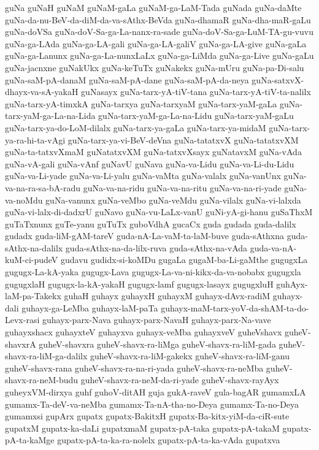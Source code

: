{guNa
guNaH
guNaM
guNaM-gaLa
guNaM-ga-LaM-Tada
guNada
guNa-daMte
guNa-da-nu-BeV-da-diM-da-va-sAthx-BeVda
guNa-dhamaR
guNa-dha-maR-gaLu
guNa-doVSa
guNa-doV-Sa-ga-La-nanx-ra-sade
guNa-doV-Sa-ga-LuM-TA-gu-vuvu
guNa-ga-LAda
guNa-ga-LA-gali
guNa-ga-LA-galiV
guNa-ga-LA-give
guNa-gaLa
guNa-ga-Lanunx
guNa-ga-La-nunxLaLx
guNa-ga-LiMda
guNa-ga-Live
guNa-gaLu
guNa-jacnxne
guNakUkx
guNa-keTuTx
guNakekx
guNa-mUru
guNa-pa-Di-salu
guNa-saM-pA-danaM
guNa-saM-pA-dane
guNa-saM-pA-da-neya
guNa-satxvX-dhayx-va-sA-yakaH
guNasayx
guNa-tarx-yA-tiV-tana
guNa-tarx-yA-tiV-ta-nalilx
guNa-tarx-yA-timxkA
guNa-tarxya
guNa-tarxyaM
guNa-tarx-yaM-gaLa
guNa-tarx-yaM-ga-La-na-Lida
guNa-tarx-yaM-ga-La-na-Lidu
guNa-tarx-yaM-gaLu
guNa-tarx-ya-do-LoM-dilalx
guNa-tarx-ya-gaLa
guNa-tarx-ya-midaM
guNa-tarx-ya-ra-hi-ta-vAgi
guNa-tarx-ya-vi-BeV-deVna
guNa-tatatxvX
guNa-tatatxvXM
guNa-ta-tatxvXmaM
guNatatxvXM
guNa-tatxvXsayx
guNatavxM
guNa-vAda
guNa-vA-gali
guNa-vAnf
guNavU
guNava
guNa-va-Lidu
guNa-va-Li-du-Lidu
guNa-va-Li-yade
guNa-va-Li-yalu
guNa-vaMta
guNa-valalx
guNa-vanUnx
guNa-va-na-ra-sa-bA-radu
guNa-va-na-ridu
guNa-va-na-ritu
guNa-va-na-ri-yade
guNa-va-noMdu
guNa-vanunx
guNa-veMbo
guNa-veMdu
guNa-vilalx
guNa-vi-lalxda
guNa-vi-lalx-di-dadxrU
guNavo
guNa-vu-LaLx-vanU
guNi-yA-gi-hanu
guSaThxM
guTaTxnunx
guTe-yanu
guTuTx
guboVdhA
gucaCx
guda
gudada
guda-dalilx
gudadx
guda-liM-gAM-tareV
guda-nA-La-vaM-ta-laM-buve
guda-sAthxna
guda-sAthx-na-dalilx
guda-sAthx-na-da-lilx-ruva
guda-sAthx-na-vAda
guda-va-nA-kuM-ci-pudeV
gudavu
gudidx-si-koMDu
gugaLa
gugaM-ba-Li-gaMthe
gugugxLa
gugugx-La-kA-yaka
gugugx-Lava
gugugx-La-va-ni-kikx-da-va-nobabx
gugugxla
gugugxlaH
gugugx-la-kA-yakaH
gugugx-lamf
gugugx-lasayx
gugugxluH
guhAyx-laM-pa-Takekx
guhaH
guhayx
guhayxH
guhayxM
guhayx-dAvx-radiM
guhayx-dali
guhayx-ga-LeMba
guhayx-laM-paTa
guhayx-maM-tarx-yoV-da-shAM-ta-do-Levx-rasi
guhayx-parx-Nava
guhayx-parx-NavaH
guhayx-parx-Na-vave
guhayxshacx
guhayxteV
guhayxva
guhayx-veMba
guhayxveV
guheVshavx
guheV-shavxrA
guheV-shavxra
guheV-shavx-ra-liMga
guheV-shavx-ra-liM-gada
guheV-shavx-ra-liM-ga-dalilx
guheV-shavx-ra-liM-gakekx
guheV-shavx-ra-liM-ganu
guheV-shavx-rana
guheV-shavx-ra-na-ri-yada
guheV-shavx-ra-neMba
guheV-shavx-ra-neM-budu
guheV-shavx-ra-neM-da-ri-yade
guheV-shavx-rayAyx
guheyxVM-dirxya
guhf
guhoV-ditAH
guja
gukA-raveV
gula-bagAR
gumamxLA
gumamx-Ta-deV-va-neMba
gumamx-Ta-nA-tha-no-Deya
gumamx-Ta-no-Deya
gumamxsi
gupArx
gupatx
gupatx-BakitxH
gupatx-Ba-kitx-yiM-da-ciR-sute
gupatxM
gupatx-ka-daLi
gupatxmaM
gupatx-pA-taka
gupatx-pA-takaM
gupatx-pA-ta-kaMge
gupatx-pA-ta-ka-ra-nolelx
gupatx-pA-ta-ka-vAda
gupatxva
}
